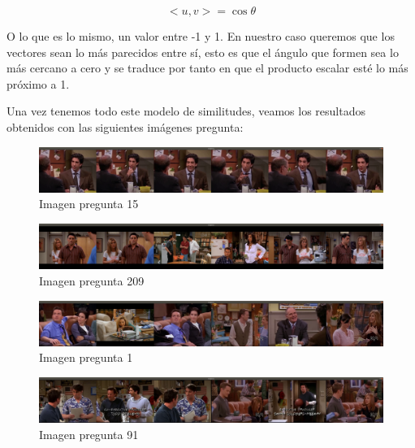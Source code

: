 \documentclass[12pt,a4paper]{article}
\begin{document}
$$<u,v> = \cos{\theta}$$

O lo que es lo mismo, un valor entre -1 y 1. En nuestro caso queremos que los vectores sean lo más parecidos entre sí, esto es que el ángulo que formen sea lo más cercano a cero y se traduce por tanto en que el producto escalar esté lo más próximo a 1.

\vspace{10px}

Una vez tenemos todo este modelo de similitudes, veamos los resultados obtenidos con las siguientes imágenes pregunta:

\begin{figure}[H]
  \centering
  \includegraphics[scale=0.135]{./Imagenes/Ejercicio2-1.png}
  \caption{Imagen pregunta 15}
	\label{Ejercicio2-1}
\end{figure}

\begin{figure}[H]
  \centering
  \includegraphics[scale=0.135]{./Imagenes/Ejercicio2-2.png}
  \caption{Imagen pregunta 209}
	\label{Ejercicio2-2}
\end{figure}

\begin{figure}[H]
  \centering
  \includegraphics[scale=0.135]{./Imagenes/Ejercicio2-3.png}
  \caption{Imagen pregunta 1}
	\label{Ejercicio2-3}
\end{figure}

\begin{figure}[H]
  \centering
  \includegraphics[scale=0.135]{./Imagenes/Ejercicio2-4.png}
  \caption{Imagen pregunta 91}
	\label{Ejercicio2-4}
\end{figure}
\end{document}
